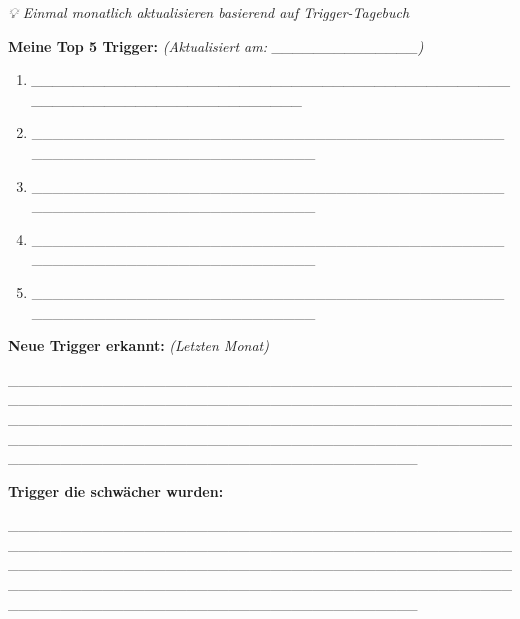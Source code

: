 \emph{💡 Einmal monatlich aktualisieren basierend auf Trigger-Tagebuch}

\textbf{Meine Top 5 Trigger:} \emph{(Aktualisiert am: \_\_\_\_\_\_\_\_\_\_\_\_\_\_)}

\begin{enumerate}
\def\labelenumi{\arabic{enumi}.}
\item
  \emph{\_\_\_\_\_\_\_\_\_\_\_\_\_\_\_\_\_\_\_\_\_\_\_\_\_\_\_\_\_\_\_\_\_\_\_\_\_\_\_\_\_\_\_\_\_\_\_\_\_\_\_\_\_\_\_\_\_\_\_\_\_\_\_\_\_\_\_\_\_\_\_\_}
\item
  \_\_\_\_\_\_\_\_\_\_\_\_\_\_\_\_\_\_\_\_\_\_\_\_\_\_\_\_\_\_\_\_\_\_\_\_\_\_\_\_\_\_\_\_\_\_\_\_\_\_\_\_\_\_\_\_\_\_\_\_\_\_\_\_\_\_\_\_\_\_\_\_
\item
  \_\_\_\_\_\_\_\_\_\_\_\_\_\_\_\_\_\_\_\_\_\_\_\_\_\_\_\_\_\_\_\_\_\_\_\_\_\_\_\_\_\_\_\_\_\_\_\_\_\_\_\_\_\_\_\_\_\_\_\_\_\_\_\_\_\_\_\_\_\_\_\_
\item
  \_\_\_\_\_\_\_\_\_\_\_\_\_\_\_\_\_\_\_\_\_\_\_\_\_\_\_\_\_\_\_\_\_\_\_\_\_\_\_\_\_\_\_\_\_\_\_\_\_\_\_\_\_\_\_\_\_\_\_\_\_\_\_\_\_\_\_\_\_\_\_\_
\item
  \_\_\_\_\_\_\_\_\_\_\_\_\_\_\_\_\_\_\_\_\_\_\_\_\_\_\_\_\_\_\_\_\_\_\_\_\_\_\_\_\_\_\_\_\_\_\_\_\_\_\_\_\_\_\_\_\_\_\_\_\_\_\_\_\_\_\_\_\_\_\_\_
\end{enumerate}

\textbf{Neue Trigger erkannt:} \emph{(Letzten Monat)}

\_\_\_\_\_\_\_\_\_\_\_\_\_\_\_\_\_\_\_\_\_\_\_\_\_\_\_\_\_\_\_\_\_\_\_\_\_\_\_\_\_\_\_\_\_\_\_\_\_\_\_\_\_\_\_\_\_\_\_\_\_\_\_\_\_\_\_\_\_\_\_\_\_\_\_\_\_\_\_\_\_\_\_\_\_\_\_\_\_\_\_\_\_\_\_\_\_\_\_\_\_\_\_\_\_\_\_\_\_\_\_\_\_\_\_\_\_\_\_\_\_\_\_\_\_\_\_\_\_\_\_\_\_\_\_\_\_\_\_\_\_\_\_\_\_\_\_\_\_\_\_\_\_\_\_\_\_\_\_\_\_\_\_\_\_\_\_\_\_\_\_\_\_\_\_\_\_\_\_\_\_\_\_\_\_\_\_\_\_\_\_\_\_\_\_\_\_\_\_\_\_\_\_\_\_\_\_\_\_\_\_\_\_\_\_\_\_\_\_\_\_\_\_\_\_\_\_\_\_\_\_

\textbf{Trigger die schwächer wurden:}

\_\_\_\_\_\_\_\_\_\_\_\_\_\_\_\_\_\_\_\_\_\_\_\_\_\_\_\_\_\_\_\_\_\_\_\_\_\_\_\_\_\_\_\_\_\_\_\_\_\_\_\_\_\_\_\_\_\_\_\_\_\_\_\_\_\_\_\_\_\_\_\_\_\_\_\_\_\_\_\_\_\_\_\_\_\_\_\_\_\_\_\_\_\_\_\_\_\_\_\_\_\_\_\_\_\_\_\_\_\_\_\_\_\_\_\_\_\_\_\_\_\_\_\_\_\_\_\_\_\_\_\_\_\_\_\_\_\_\_\_\_\_\_\_\_\_\_\_\_\_\_\_\_\_\_\_\_\_\_\_\_\_\_\_\_\_\_\_\_\_\_\_\_\_\_\_\_\_\_\_\_\_\_\_\_\_\_\_\_\_\_\_\_\_\_\_\_\_\_\_\_\_\_\_\_\_\_\_\_\_\_\_\_\_\_\_\_\_\_\_\_\_\_\_\_\_\_\_\_\_\_

\hypertarget{section-1}{%
\subsection{}\label{section-1}}

